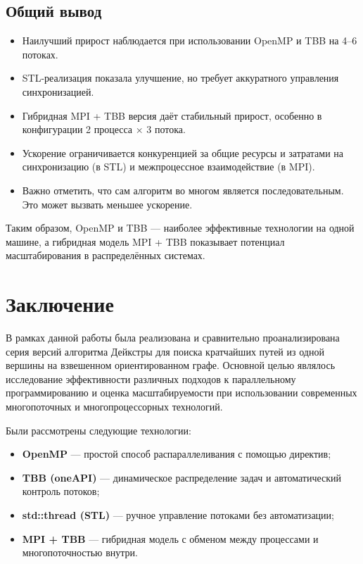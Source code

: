 \documentclass[12pt,a4paper]{extarticle}
\begin{document}
\subsection{Общий вывод}

\begin{itemize}
  \item Наилучший прирост наблюдается при использовании OpenMP и TBB на 4–6 потоках.
  \item STL-реализация показала улучшение, но требует аккуратного управления синхронизацией.
  \item Гибридная MPI + TBB версия даёт стабильный прирост, особенно в конфигурации 2 процесса × 3 потока.
  \item Ускорение ограничивается конкуренцией за общие ресурсы и затратами на синхронизацию (в STL)
  и межпроцессное взаимодействие (в MPI).
  \item Важно отметить, что сам алгоритм во многом является последовательным. Это может вызвать меньшее ускорение.
\end{itemize}

Таким образом, OpenMP и TBB — наиболее эффективные технологии на одной машине,
а гибридная модель MPI + TBB показывает потенциал масштабирования в распределённых системах.


\section{Заключение}

В рамках данной работы была реализована и сравнительно проанализирована серия версий
алгоритма Дейкстры для поиска кратчайших путей из одной вершины на взвешенном
ориентированном графе. Основной целью являлось исследование эффективности различных
подходов к параллельному программированию и оценка масштабируемости при использовании
современных многопоточных и многопроцессорных технологий.

Были рассмотрены следующие технологии:
\begin{itemize}
  \item \textbf{OpenMP} — простой способ распараллеливания с помощью директив;
  \item \textbf{TBB (oneAPI)} — динамическое распределение задач и автоматический
        контроль потоков;
  \item \textbf{std::thread (STL)} — ручное управление потоками без автоматизации;
  \item \textbf{MPI + TBB} — гибридная модель с обменом между процессами и
        многопоточностью внутри.
\end{itemize}
\end{document}
